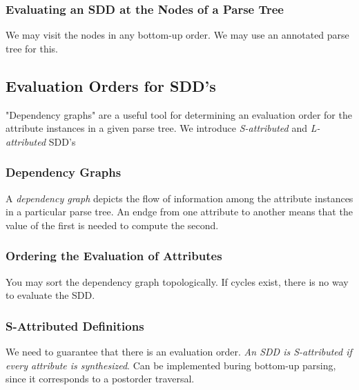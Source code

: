 \documentclass{article}
\begin{document}
\subsubsection{Evaluating an SDD at the Nodes of a Parse Tree} %
\label{ssub:Evaluating an SDD at the Nodes of a Parse Tree}
We may visit the nodes in any bottom-up order. We may use an annotated parse tree for this.


\subsection{Evaluation Orders for SDD's} %
\label{sub:Evaluation Orders for SDD's}
"Dependency graphs" are a useful tool for determining an evaluation order for the attribute instances in a given parse tree. We introduce \emph{S-attributed} and \emph{L-attributed} SDD's

\subsubsection{Dependency Graphs} %
\label{ssub:Dependency Graphs}
A \emph{dependency graph} depicts the flow of information among the attribute instances in a particular parse tree. An endge from one attribute to another means that the value of the first is needed to compute the second.

\subsubsection{Ordering the Evaluation of Attributes} %
\label{ssub:Ordering the Evaluation of Attributes}
You may sort the dependency graph topologically. If cycles exist, there is no way to evaluate the SDD.

\subsubsection{S-Attributed Definitions} %
\label{ssub:S-Attributed Definitions}
We need to guarantee that there is an evaluation order. \emph{An SDD is S-attributed if every attribute is synthesized}. Can be implemented buring bottom-up parsing, since it corresponds to a postorder traversal.
\end{document}
